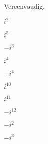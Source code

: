 \documentclass{ximera}
\begin{document}
\begin{exercise}{Vereenvoudig.}
\begin{xmmulticols}[6]
\begin{question}
    \(i^2\)
\end{question}
\begin{question}
    \(i^5\)
\end{question}
\begin{question}
    \(-i^3\)
\end{question}
\begin{question}
    \(i^4\)
\end{question}
\begin{question}
    \(-i^4\)
\end{question}
\begin{question}
    \(i^{10}\)
\end{question}
\begin{question}
    \(i^{11}\)
\end{question}
\begin{question}
    \(-i^{12}\)
\end{question}
\begin{question}
    \(-i^2\)
\end{question}
\begin{question}
    \(-i^3\)
\end{question}
\end{xmmulticols}
\end{exercise}

\end{document}
